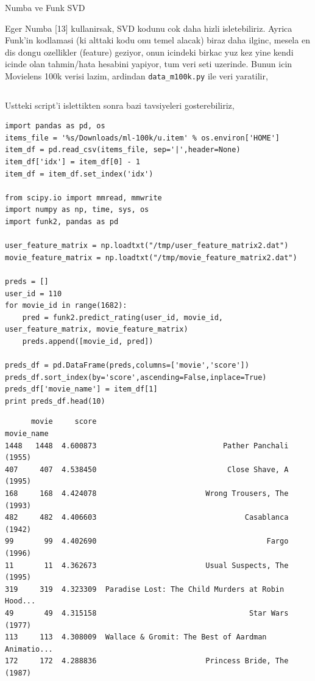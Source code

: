 \documentclass[12pt,fleqn]{article}\usepackage{../common}
\begin{document}
Numba ve Funk SVD

Eger Numba [13] kullanirsak, SVD kodunu cok daha hizli
isletebiliriz. Ayrica Funk'in kodlamasi (ki alttaki kodu onu temel alacak)
biraz daha ilginc, mesela en dis dongu ozellikler (feature) geziyor, onun
icindeki birkac yuz kez yine kendi icinde olan tahmin/hata hesabini
yapiyor, tum veri seti uzerinde. Bunun icin Movielens 100k verisi lazim,
ardindan \verb!data_m100k.py! ile veri yaratilir,

\inputminted[fontsize=\footnotesize]{python}{funk2.py}

Ustteki script'i islettikten sonra bazi tavsiyeleri gosterebiliriz,


\begin{verbatim}
import pandas as pd, os
items_file = '%s/Downloads/ml-100k/u.item' % os.environ['HOME']
item_df = pd.read_csv(items_file, sep='|',header=None)
item_df['idx'] = item_df[0] - 1
item_df = item_df.set_index('idx')

from scipy.io import mmread, mmwrite
import numpy as np, time, sys, os
import funk2, pandas as pd

user_feature_matrix = np.loadtxt("/tmp/user_feature_matrix2.dat")
movie_feature_matrix = np.loadtxt("/tmp/movie_feature_matrix2.dat")

preds = []
user_id = 110
for movie_id in range(1682):
    pred = funk2.predict_rating(user_id, movie_id, user_feature_matrix, movie_feature_matrix)
    preds.append([movie_id, pred])

preds_df = pd.DataFrame(preds,columns=['movie','score'])
preds_df.sort_index(by='score',ascending=False,inplace=True)
preds_df['movie_name'] = item_df[1]
print preds_df.head(10)
\end{verbatim}

\begin{verbatim}
      movie     score                                         movie_name
1448   1448  4.600873                             Pather Panchali (1955)
407     407  4.538450                              Close Shave, A (1995)
168     168  4.424078                         Wrong Trousers, The (1993)
482     482  4.406603                                  Casablanca (1942)
99       99  4.402690                                       Fargo (1996)
11       11  4.362673                         Usual Suspects, The (1995)
319     319  4.323309  Paradise Lost: The Child Murders at Robin Hood...
49       49  4.315158                                   Star Wars (1977)
113     113  4.308009  Wallace & Gromit: The Best of Aardman Animatio...
172     172  4.288836                         Princess Bride, The (1987)
\end{verbatim}
\end{document}
